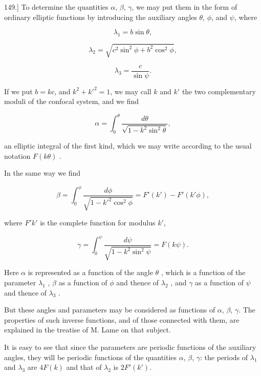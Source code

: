 \documentclass[11pt,a4paper]{article}
\begin{document}
149.] To determine the quantities $\alpha$, $\beta$, $\gamma$, we may put them in the form of ordinary elliptic functions by introducing the auxiliary angles $\theta$, $\phi$, and $\psi$, where

\begin{equation}\tag{12}
\lambda_1 = b \sin \theta,
\end{equation}

\begin{equation}\tag{13}
\lambda_2 = \sqrt{c^2 \sin^2 \phi + b^2 \cos^2 \phi},
\end{equation}

\begin{equation}\tag{14}
\lambda_3 = \frac{c}{\sin \psi}.
\end{equation}

If we put $b=kc$, and $k^2+k'^2=1$, we may call $k$ and $k'$ the two complementary moduli of the confocal system, and we find

\begin{equation}\tag{15}
\alpha = \int_0^\theta \frac{d\theta}{\sqrt{1-k^2\sin^2\theta}},
\end{equation}

an elliptic integral of the first kind, which we may write according to the usual notation  $F(k\theta)$ .

In the same way we find

\begin{equation}\tag{16}
\beta = \int_0^{\phi} \frac{d\phi}{\sqrt{1-k'^2\cos^2\phi}} = F'(k') - F'(k'\phi),
\end{equation}

where $F'k'$ is the complete function for modulus $k'$,

\begin{equation}\tag{17}
\gamma = \int_0^{\psi} \frac{d\psi}{\sqrt{1-k^2\sin^2\psi}} = F(k\psi).
\end{equation}

Here  $\alpha$  is represented as a function of the angle  $\theta$ , which is a function of the parameter  $\lambda_1$ ,  $\beta$  as a function of  $\phi$  and thence of  $\lambda_2$ , and  $\gamma$  as a function of  $\psi$  and thence of  $\lambda_3$ .

But these angles and parameters may be considered as functions of $\alpha$, $\beta$, $\gamma$. The properties of such inverse functions, and of those connected with them, are explained in the treatise of M. Lame on that subject.

It is easy to see that since the parameters are periodic functions of the auxiliary angles, they will be periodic functions of the quantities $\alpha$, $\beta$, $\gamma$: the periods of $\lambda_1$ and $\lambda_3$ are $4F(k)$ and that of $\lambda_2$ is $2F'(k')$.
\end{document}
